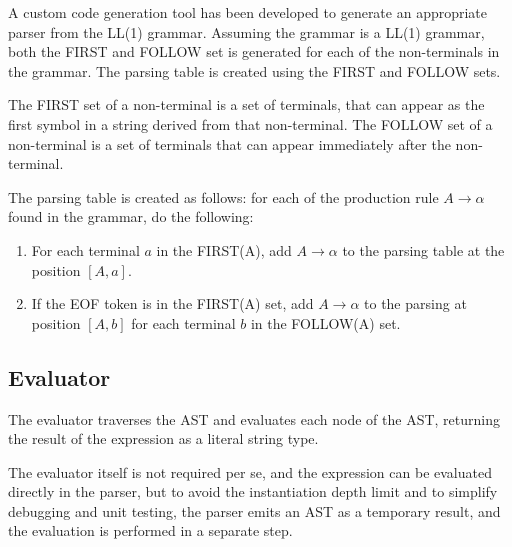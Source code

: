 A custom code generation tool has been developed to generate an appropriate parser from the LL(1) grammar. Assuming the grammar is a LL(1) grammar, both the FIRST and FOLLOW set is generated for each of the non-terminals in the grammar. The parsing table is created using the FIRST and FOLLOW sets.

The FIRST set of a non-terminal is a set of terminals, that can appear as the first symbol in a string derived from that non-terminal. The FOLLOW set of a non-terminal is a set of terminals that can appear immediately after the non-terminal.

The parsing table is created as follows: for each of the production rule $A \rightarrow \alpha$ found in the grammar, do the following:

\begin{enumerate}
  \item For each terminal $a$ in the FIRST(A), add $A \rightarrow \alpha$ to the parsing table at the position $[A, a]$.
  \item If the EOF token is in the FIRST(A) set, add $A \rightarrow \alpha$ to the parsing at position $[A, b]$ for each terminal $b$ in the FOLLOW(A) set.
\end{enumerate}

\subsection{Evaluator}

The evaluator traverses the AST and evaluates each node of the AST, returning the result of the expression as a literal string type.

The evaluator itself is not required per se, and the expression can be evaluated directly in the parser, but to avoid the instantiation depth limit and to simplify debugging and unit testing, the parser emits an AST as a temporary result, and the evaluation is performed in a separate step.
